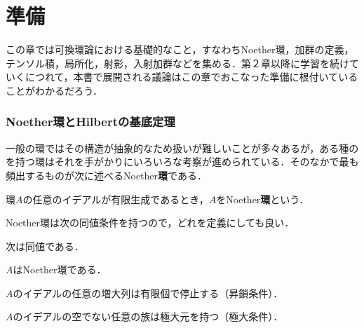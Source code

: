 \part[Preliminaries]{準備}
この章では可換環論における基礎的なこと，すなわちNoether環，加群の定義，テンソル積，局所化，射影，入射加群などを集める．第２章以降に学習を続けていくにつれて，本書で展開される議論はこの章でおこなった準備に根付いていることがわかるだろう．

\section{Noether環とHilbertの基底定理}

一般の環ではその構造が抽象的なため扱いが難しいことが多々あるが，ある種のを持つ環はそれを手がかりにいろいろな考察が進められている．そのなかで最も頻出するものが次に述べるNoether\textbf{環}である．

\begin{defi}[Noether環]\label{defi:Noether環}
	環$A$の任意のイデアルが有限生成であるとき，$A$をNoether\textbf{環}という．
\end{defi}

Noether環は次の同値条件を持つので，どれを定義にしても良い．

\begin{prop}
	次は同値である．
	\begin{sakura}
		\item $A$はNoether環である．
		\item $A$のイデアルの任意の増大列は有限個で停止する（昇鎖条件）．
		\item $A$のイデアルの空でない任意の族は極大元を持つ（極大条件）．
	\end{sakura}
\end{prop}

